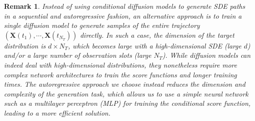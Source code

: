 \documentclass[11pt]{article}
\newtheorem{remark}{Remark}
\newcommand{\bX}{\mathbf{X}}
\begin{document}
\begin{remark}
Instead of using conditional diffusion models to generate SDE paths in a sequential and autoregressive fashion, an alternative approach is to train a single diffusion model to generate samples of the entire trajectory $(\bX(t_1), \cdots, \bX(t_{N_T}))$ directly.
In such a case, the dimension of the target distribution is $d\times N_T$, which becomes large with a high-dimensional SDE (large $d$) and/or a large number of observation slots (large $N_T$). While diffusion models can indeed deal with high-dimensional distributions, they nonetheless require more complex network architectures to train the score functions and longer training times. The autoregressive approach we choose instead reduces the dimension and complexity of the generation task, which allows us to use a simple neural network such as a multilayer perceptron (MLP) for training the conditional score function, leading to a more efficient solution.
\end{remark}

\end{document}
